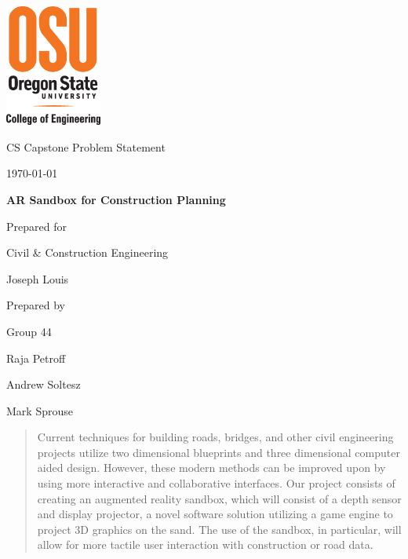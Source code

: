 \documentclass[onecolumn, draftclsnofoot,10pt, compsoc]{IEEEtran}
\def \CapstoneTeamName{		The Cleverly Named Team}
\def \CapstoneTeamNumber{		44}
\def \GroupMemberOne{			Raja Petroff}
\def \GroupMemberTwo{			Andrew Soltesz}
\def \GroupMemberThree{			Mark Sprouse}
\def \CapstoneProjectName{		AR Sandbox for Construction Planning}
\def \CapstoneSponsorCompany{	Civil \& Construction Engineering}
\def \CapstoneSponsorPerson{		Joseph Louis}
\def \DocType{		Problem Statement
				}
\newcommand{\NameSigPair}[1]{\par
\makebox[2.75in][r]{#1} \hfil 	\makebox[3.25in]{\makebox[2.25in]{\hrulefill} \hfill		\makebox[.75in]{\hrulefill}}
\par\vspace{-12pt} \textit{\tiny\noindent
\makebox[2.75in]{} \hfil		\makebox[3.25in]{\makebox[2.25in][r]{Signature} \hfill	\makebox[.75in][r]{Date}}}}
\renewcommand{\NameSigPair}[1]{#1}
\begin{document}
\begin{titlepage}
    \begin{singlespace}
    	\includegraphics[height=4cm]{coe_v_spot1}
        \hfill 
        \par\vspace{.2in}
        \centering
        \scshape{
            \huge CS Capstone \DocType \par
            {\large\today}\par
            \vspace{.5in}
            \textbf{\Huge\CapstoneProjectName}\par
            \vfill
            {\large Prepared for}\par
            \Huge \CapstoneSponsorCompany\par
            \vspace{5pt}
            {\Large\NameSigPair{\CapstoneSponsorPerson}\par}
            {\large Prepared by }\par
            Group\CapstoneTeamNumber\par
            \vspace{5pt}
            {\Large
                \NameSigPair{\GroupMemberOne}\par
                \NameSigPair{\GroupMemberTwo}\par
                \NameSigPair{\GroupMemberThree}\par
            }
            \vspace{20pt}
        }
        \begin{abstract}
        	Current techniques for building roads, bridges, and other civil engineering projects utilize two dimensional blueprints and three dimensional computer aided design.
			However, these modern methods can be improved upon by using more interactive and collaborative interfaces.
			Our project consists of creating an augmented reality sandbox, which will consist of a depth sensor and display projector, a novel software solution utilizing a game engine to project 3D graphics on the sand.
			The use of the sandbox, in particular, will allow for more tactile user interaction with construction or road data.
        \end{abstract}     
    \end{singlespace}
\end{titlepage}
\end{document}
